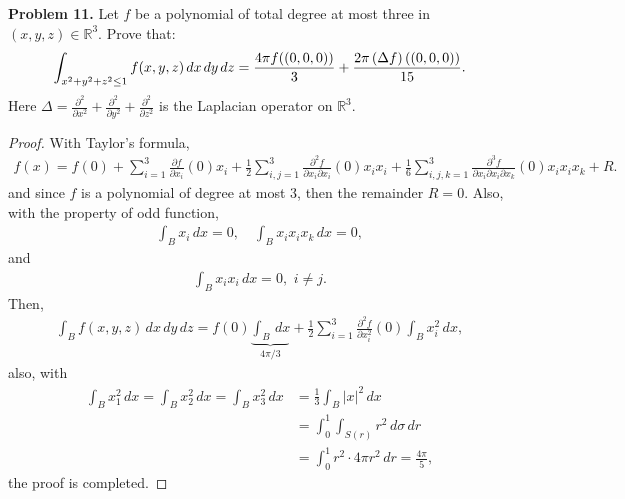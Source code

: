 \documentclass[12pt,leqno]{amsart}
\theoremstyle{definition}
\begin{document}
\noindent
{\bf Problem 11.}
Let $f$ be a polynomial of total degree at most three in $(x, y, z) \in \mathbb{R}^3$.  Prove that:
$$
\int_{x^2 + y^2 + z^2 \le 1} f(x, y, z)\hspace{1.5pt} dx\hspace{1.5pt}  dy \hspace{1.5pt} dz =
\frac{4\pi f((0, 0, 0)) }{3} +  \frac{2\pi \left(\Delta f\right)((0, 0, 0))}{15}.
$$
Here $\displaystyle{\Delta =  \frac{\partial^2}{\partial x^2}  +  \frac{\partial^2}{\partial y^2} +
	\frac{\partial^2}{\partial z^2}}$ is the Laplacian operator on $\mathbb{R}^3$.
\begin{proof}
With Taylor's formula, 
\begin{align*}
    f(x) = f(0) + \sum^3_{i=1} \frac{\partial f}{\partial x_i}(0) x_i + \frac{1}{2} \sum^3_{i,j=1} \frac{\partial^2 f}{\partial x_i \partial x_i}(0)x_i x_i + \frac{1}{6} \sum^3_{i,j,k=1} \frac{\partial^3 f}{\partial x_i \partial x_i \partial x_k}(0)x_i x_i x_k + R.
\end{align*}
and since $f$ is a polynomial of degree at most $3$, then the remainder $R = 0$. Also, with the property of odd function,
\begin{align*}
    \int_B x_i\, dx = 0,\quad \int_B x_i x_i x_k\, dx = 0,
\end{align*}
and
\begin{align*}
    \int_B x_i x_i\, dx = 0,\,\, i\neq j.
\end{align*}
Then, 
\begin{align*}
    \int_B f(x, y, z)\, dx\,dy\,dz = f(0) \underbrace{\int_B\, dx}_{4\pi/3}  + \frac{1}{2} \sum^3_{i=1} \frac{\partial^2 f}{\partial x^2_i}(0) \int_B x_i^2\, dx,
\end{align*}
also, with 
\begin{align*}
    \int_B x_1^2\, dx = \int_B x_2^2\, dx = \int_B x_3^2\, dx & = \frac{1}{3} \int_B |x|^2\, dx \\
    & = \int^1_0 \int_{S(r)} r^2\, d\sigma\, dr \\
    & = \int^1_0 r^2 \cdot 4\pi r^2\, dr = \frac{4\pi}{5},
\end{align*}
the proof is completed. 
\end{proof}


\medskip
\end{document}
